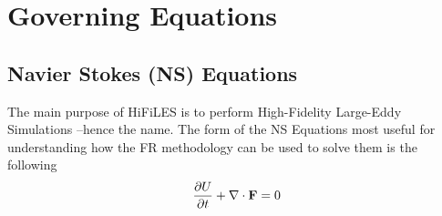 
\section{Governing Equations}
\label{sec:govEq}
\subsection{Navier Stokes (NS) Equations}
The main purpose of HiFiLES is to perform High-Fidelity Large-Eddy Simulations --hence the name. The form of the NS Equations most useful for understanding how the FR methodology can be used to solve them is the following
\begin{equation}
\frac{\partial U}{\partial t} +  \nabla \cdot {\bf F} = 0
\end{equation}

